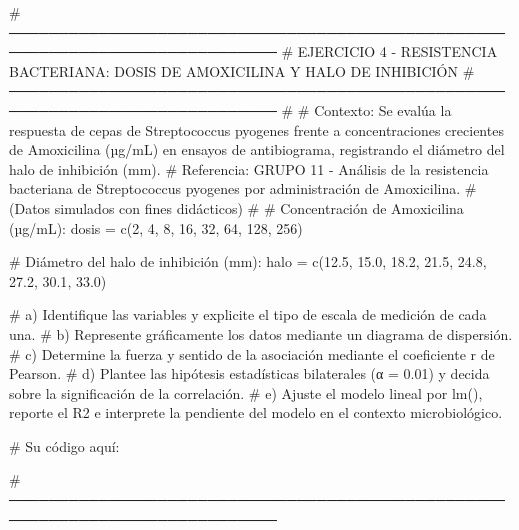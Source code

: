 \documentclass[
  spanish,
  letterpaper,
  DIV=11,
  numbers=noendperiod]{scrreprt}
\newenvironment{Shaded}{\begin{snugshade}}{\end{snugshade}}
\newcommand{\CommentTok}[1]{\textcolor[rgb]{0.37,0.37,0.37}{#1}}
\newcommand{\DecValTok}[1]{\textcolor[rgb]{0.68,0.00,0.00}{#1}}
\newcommand{\FloatTok}[1]{\textcolor[rgb]{0.68,0.00,0.00}{#1}}
\newcommand{\FunctionTok}[1]{\textcolor[rgb]{0.28,0.35,0.67}{#1}}
\newcommand{\NormalTok}[1]{\textcolor[rgb]{0.00,0.23,0.31}{#1}}
\newcommand{\OtherTok}[1]{\textcolor[rgb]{0.00,0.23,0.31}{#1}}
\begin{document}
\begin{Shaded}
\begin{Highlighting}[]
\CommentTok{\# ─────────────────────────────────────────────────────────────────────────────}
\CommentTok{\# EJERCICIO 4 {-} RESISTENCIA BACTERIANA: DOSIS DE AMOXICILINA Y HALO DE INHIBICIÓN}
\CommentTok{\# ─────────────────────────────────────────────────────────────────────────────}
\CommentTok{\#}
\CommentTok{\# Contexto: Se evalúa la respuesta de cepas de Streptococcus pyogenes frente a concentraciones crecientes de Amoxicilina (µg/mL) en ensayos de antibiograma, registrando el diámetro del halo de inhibición (mm).}
\CommentTok{\# Referencia: GRUPO 11 {-} Análisis de la resistencia bacteriana de Streptococcus pyogenes por administración de Amoxicilina.}
\CommentTok{\# (Datos simulados con fines didácticos)}
\CommentTok{\#}
\CommentTok{\# Concentración de Amoxicilina (µg/mL):}
\NormalTok{dosis }\OtherTok{=} \FunctionTok{c}\NormalTok{(}\DecValTok{2}\NormalTok{, }\DecValTok{4}\NormalTok{, }\DecValTok{8}\NormalTok{, }\DecValTok{16}\NormalTok{, }\DecValTok{32}\NormalTok{, }\DecValTok{64}\NormalTok{, }\DecValTok{128}\NormalTok{, }\DecValTok{256}\NormalTok{)}

\CommentTok{\# Diámetro del halo de inhibición (mm):}
\NormalTok{halo }\OtherTok{=} \FunctionTok{c}\NormalTok{(}\FloatTok{12.5}\NormalTok{, }\FloatTok{15.0}\NormalTok{, }\FloatTok{18.2}\NormalTok{, }\FloatTok{21.5}\NormalTok{, }\FloatTok{24.8}\NormalTok{, }\FloatTok{27.2}\NormalTok{, }\FloatTok{30.1}\NormalTok{, }\FloatTok{33.0}\NormalTok{)}

\CommentTok{\# a) Identifique las variables y explicite el tipo de escala de medición de cada una.}
\CommentTok{\# b) Represente gráficamente los datos mediante un diagrama de dispersión.}
\CommentTok{\# c) Determine la fuerza y sentido de la asociación mediante el coeficiente r de Pearson.}
\CommentTok{\# d) Plantee las hipótesis estadísticas bilaterales (α = 0.01) y decida sobre la significación de la correlación.}
\CommentTok{\# e) Ajuste el modelo lineal por lm(), reporte el R2 e interprete la pendiente del modelo en el contexto microbiológico.}

\CommentTok{\# Su código aquí:}

\CommentTok{\# ─────────────────────────────────────────────────────────────────────────────}



\end{Highlighting}
\end{Shaded}
\end{document}

